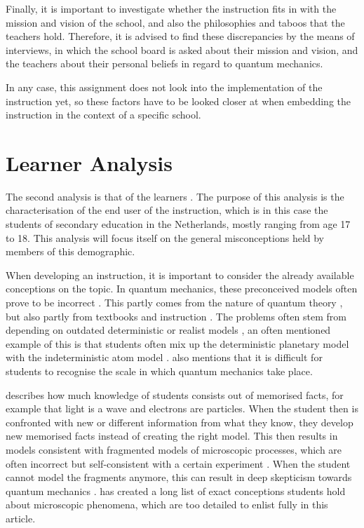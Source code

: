 \documentclass[11pt,twoside]{report} %
\begin{document}
Finally, it is important to investigate whether the instruction fits in with the mission and vision of the school, and also the philosophies and taboos that the teachers hold. Therefore, it is advised to find these discrepancies by the means of interviews, in which the school board is asked about their mission and vision, and the teachers about their personal beliefs in regard to quantum mechanics.

In any case, this assignment does not look into the implementation of the instruction yet, so these factors have to be looked closer at when embedding the instruction in the context of a specific school.


\chapter{Learner Analysis}
\label{ch:learneranalysis}

The second analysis is that of the learners \cite{smithragan}. The purpose of this analysis is the characterisation of the end user of the instruction, which is in this case the students of secondary education in the Netherlands, mostly ranging from age 17 to 18. This analysis will focus itself on the general misconceptions held by members of this demographic.

When developing an instruction, it is important to consider the already available conceptions on the topic. In quantum mechanics, these preconceived models often prove to be incorrect \cite{asikainen, papaphotis2, thacker}. This partly comes from the nature of quantum theory \cite{papaphotis2}, but also partly from textbooks and instruction \cite{hubber, papaphotis2}. The problems often stem from depending on outdated deterministic or realist models \cite{hubber, papaphotis1, papaphotis2}, an often mentioned example of this is that students often mix up the deterministic planetary model with the indeterministic atom model \cite{dori, henriksen, hubber, muller, papaphotis1, papaphotis2}.  also mentions that it is difficult for students to recognise the scale in which quantum mechanics take place.

 describes how much knowledge of students consists out of memorised facts, for example that light is a wave and electrons are particles. When the student then is confronted with new or different information from what they know, they develop new memorised facts instead of creating the right model. This then results in models consistent with fragmented models of microscopic processes, which are often incorrect but self-consistent with a certain experiment \cite{hubber, thacker}. When the student cannot model the fragments anymore, this can result in deep skepticism towards quantum mechanics \cite{barnes, henriksen, levrini}.  has created a long list of exact conceptions students hold about microscopic phenomena, which are too detailed to enlist fully in this article.
\end{document}
